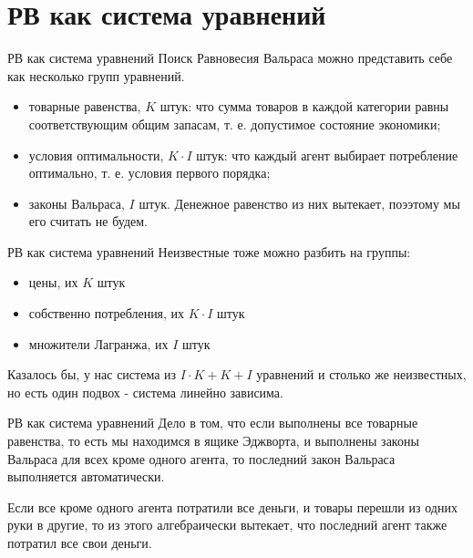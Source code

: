 \documentclass{beamer}
\begin{document}
\section{РВ как система уравнений}

\begin{frame}{РВ как система уравнений}
Поиск Равновесия Вальраса можно представить себе как несколько групп уравнений.

\begin{itemize}
  \item товарные равенства, $K$ штук: что сумма товаров в каждой категории равны соответствующим общим запасам, т. е. допустимое состояние экономики;
  \item условия оптимальности, $K \cdot I$ штук: что каждый агент выбирает потребление оптимально, т. е. условия первого порядка;
  \item законы Вальраса, $I$ штук. Денежное равенство из них вытекает, поээтому мы его считать не будем.
\end{itemize}

\end{frame}

\begin{frame}{РВ как система уравнений}
Неизвестные тоже можно разбить на группы:

\begin{itemize}
  \item цены, их $K$ штук
  \item собственно потребления, их $K \cdot I$ штук
  \item множители Лагранжа, их $I$ штук
\end{itemize}

Казалось бы, у нас система из $I\cdot K + K + I$ уравнений и столько же неизвестных, но есть один подвох - система линейно зависима. 

\end{frame}

\begin{frame}{РВ как система уравнений}
Дело в том, что если выполнены все товарные равенства, то есть мы находимся в ящике Эджворта, и выполнены законы Вальраса для всех кроме одного агента, то \alert{последний закон Вальраса выполняется автоматически}. 

Если все кроме одного агента потратили все деньги, и товары перешли из одних руки в другие, то из этого алгебраически вытекает, что последний агент также потратил все свои деньги. 

\end{frame}
\end{document}
